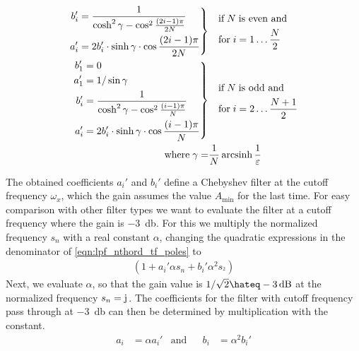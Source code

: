 \begin{align*}
  \left.\begin{aligned}
    b_i' &= \frac{1}{\cosh^2\gamma - \cos^2\frac{(2i-1)\pi}{2N}}\;\\
    a_i' &= 2b_i'\cdot\sinh\gamma\cdot\cos\frac{(2i-1)\pi}{2N}
  \end{aligned}\right\}&
  \quad\begin{aligned}
    &\text{if}\;N\;\text{is even and}\\
    &\text{for}\;i=1\dots\frac{N}{2}
  \end{aligned}\\
  \left.\begin{aligned}
    b_1' &= 0\\
    a_1' &= 1/\sin\gamma\\
    b_i' &= \frac{1}{\cosh^2\gamma - \cos^2\frac{(i-1)\pi}{N}}\;\\
    a_i' &= 2b_i'\cdot\sinh\gamma\cdot\cos\frac{(i-1)\pi}{N}
  \end{aligned}\right\}&
  \quad\begin{aligned}
    &\text{if}\;N\;\text{is odd and}\\
    &\text{for}\;i=2\dots\frac{N+1}{2}
  \end{aligned}\\
  \text{where}\; \gamma = &\frac{1}{N}\operatorname{arcsinh}\frac{1}{\varepsilon}
\end{align*}

The obtained coefficients $a_i'$ and $b_i'$ define a Chebyshev filter at the cutoff frequency $\omega_x$, which the gain assumes the value $A_{\min}$ for the last time. For easy comparison with other filter types we want to evaluate the filter at a cutoff frequency where the gain is \SI{-3}{\decibel}. For this we multiply the normalized frequency $s_n$ with a real constant $\alpha$, changing the quadratic expressions in the denominator of \eqref{eqn:lpf_nthord_tf_poles} to
\begin{align}
  (1 + a_i'\alpha s_n + b_i'\alpha^2s_^2)
\end{align}
Next, we evaluate $\alpha$, so that the gain value is $1/\sqrt{2}\hateq\SI{-3}{\decibel}$ at the normalized frequency $s_n=\mathrm{j}\mkern1mu$. The coefficients for the filter with cutoff frequency pass through at \SI{-3}{\decibel} can then be determined by multiplication with the constant.
\begin{align*}
  a_i &= \alpha a_i' &\text{and}& &b_i &= \alpha^2b_i'
\end{align*}

